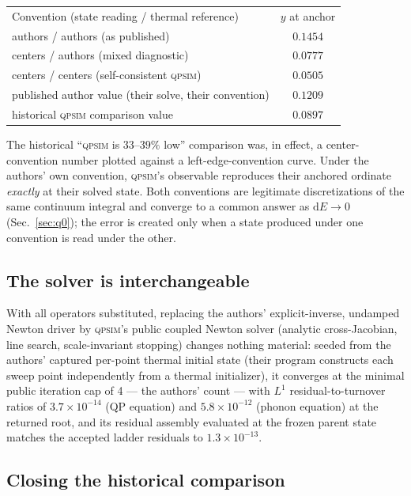 \documentclass[reprint,amsmath,amssymb,aps,prapplied,nofootinbib]{revtex4-2}
\newcommand{\qpsim}{\textsc{qpsim}}
\begin{document}
\begin{table}[h]
\begin{ruledtabular}
\begin{tabular}{lc}
Convention (state reading / thermal reference) & $y$ at anchor \\
\colrule
authors / authors (as published) & $0.1454$ \\
centers / authors (mixed diagnostic) & $0.0777$ \\
centers / centers (self-consistent \qpsim{}) & $0.0505$ \\
\colrule
published author value (their solve, their convention) & $0.1209$ \\
historical \qpsim{} comparison value & $0.0897$ \\
\end{tabular}
\end{ruledtabular}
\end{table}

\noindent
The historical ``\qpsim{} is $33\text{--}39\%$ low'' comparison was, in
effect, a center-convention number plotted against a left-edge-convention
curve.  Under the authors' own convention, \qpsim{}'s observable
reproduces their anchored ordinate \emph{exactly} at their solved state.
Both conventions are legitimate discretizations of the same continuum
integral and converge to a common answer as $\mathrm{d}E \to 0$
(Sec.~\ref{sec:q0}); the error is created only when a state produced
under one convention is read under the other.

\subsection{The solver is interchangeable}

With all operators substituted, replacing the authors' explicit-inverse,
undamped Newton driver by \qpsim{}'s public coupled Newton solver
(analytic cross-Jacobian, line search, scale-invariant stopping) changes
nothing material: seeded from the authors' captured per-point thermal
initial state (their program constructs each sweep point independently
from a thermal initializer),
it converges at the minimal public iteration cap of 4 --- the authors'
count --- with $L^1$ residual-to-turnover ratios of
$3.7\times10^{-14}$ (QP equation) and $5.8\times10^{-12}$ (phonon
equation) at the returned root, and its residual assembly evaluated at
the frozen parent state matches the accepted ladder residuals to
$1.3\times10^{-13}$.

\subsection{Closing the historical comparison}
\end{document}
